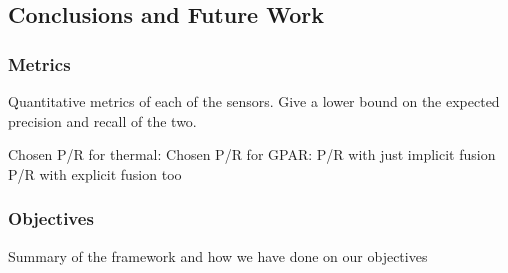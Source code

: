 \subsection{Conclusions and Future Work}

\subsubsection{Metrics}
Quantitative metrics of each of the sensors. Give a lower bound on the expected precision and recall of the two.

Chosen P/R for thermal:
Chosen P/R for GPAR:
P/R with just implicit fusion
P/R with explicit fusion too

\subsubsection{Objectives}
Summary of the framework and how we have done on our objectives

